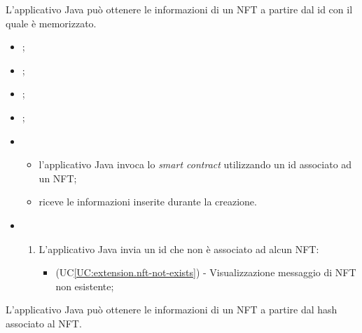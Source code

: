 \label{UC:get-nft-by-id}

L'applicativo Java può ottenere le informazioni di un NFT a partire dal id con il quale è memorizzato.

\begin{itemize}
  \item {};
  \item {};
  \item {};
  \item {};
  \item \UCMain
  \begin{itemize}
    \item l'applicativo Java invoca lo \textit{smart contract} utilizzando un id associato ad un NFT;
    \item riceve le informazioni inserite durante la creazione.
  \end{itemize}

  \item \UCExt
  \begin{enumerate}[label=\lett]
    \item L'applicativo Java invia un id che non è associato ad alcun NFT:
    \begin{itemize}
      \item (UC\ref{UC:extension.nft-not-exists}) - Visualizzazione messaggio di NFT non esistente;
    \end{itemize}
  \end{enumerate}
\end{itemize}

\label{UC:get-nft-by-hash}

L'applicativo Java può ottenere le informazioni di un NFT a partire dal hash associato al NFT.

